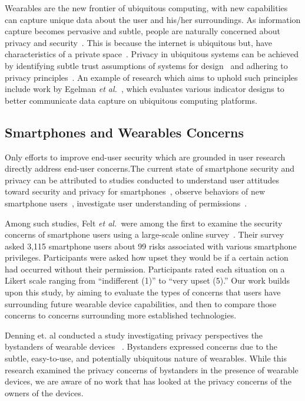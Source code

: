 \documentclass{acm_proc_article-sp}
\def\etal{{\it et al.~}}
\begin{document}
Wearables are the new frontier of ubiquitous computing, with new capabilities can capture unique data about the user and his/her surroundings. As information capture becomes pervasive and subtle, people are naturally concerned about privacy and security~\cite{palen2003unpacking}. This is because the internet is ubiquitous but, have characteristics of a private space~\cite{camp2000internet}. Privacy in ubiquitous systems can be achieved by  identifying subtle trust assumptions of systems for design~\cite{camp2003designing} and adhering to privacy principles~\cite{langheinrich2001privacy}. An example of research which aims to uphold such principles include work by Egelman \etal , which evaluates various indicator designs to better communicate data capture on ubiquitous computing platforms. 

\subsection{Smartphones and Wearables Concerns}
Only efforts to improve end-user security which are grounded in user research directly address end-user concerns.The current state of smartphone security and privacy can be attributed to studies conducted to understand user attitudes toward security and privacy for smartphones~\cite{chin2012measuring}, observe behaviors of new smartphone users~\cite{palen2000going}, investigate user understanding of permissions~\cite{felt2012android}. 

Among such studies, Felt \etal were among the first to examine the security concerns of smartphone users using a large-scale online survey~\cite{Felt}. Their survey asked 3,115 smartphone users about 99 risks associated with various smartphone privileges. Participants were asked how upset they would be if a certain action had occurred without their permission. Participants rated each situation on a Likert scale ranging from ``indifferent (1)'' to ``very upset (5).'' Our work builds upon this study, by aiming to evaluate the types of concerns that users have surrounding future wearable device capabilities, and then to compare those concerns to concerns surrounding more established technologies.

Denning et. al conducted a study investigating privacy perspectives the bystanders of wearable devices ~\cite{Denning2014}. Bystanders expressed concerns due to the subtle, easy-to-use, and potentially ubiquitous nature of wearables. While this research examined the privacy concerns of bystanders in the presence of wearable devices, we are aware of no work that has looked at the privacy concerns of the owners of the devices.
\end{document}
